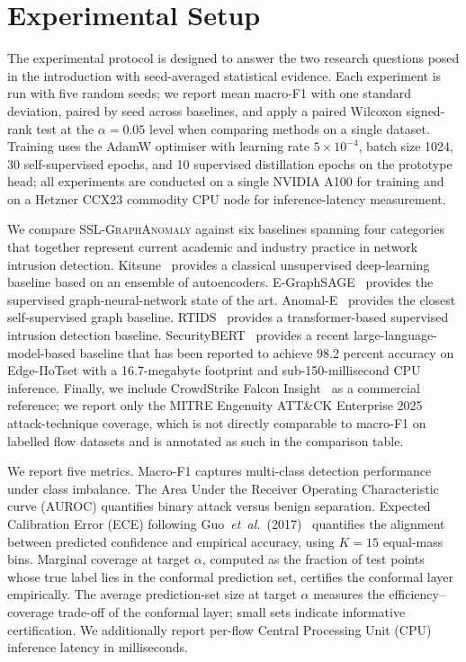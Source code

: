 \documentclass{ieeeaccess}
\begin{document}
\section{Experimental Setup}
\label{sec:experiments}
The experimental protocol is designed to answer the two research questions
posed in the introduction with seed-averaged statistical evidence. Each
experiment is run with five random seeds; we report mean macro-F1 with one
standard deviation, paired by seed across baselines, and apply a paired
Wilcoxon signed-rank test at the $\alpha = 0.05$ level when comparing
methods on a single dataset. Training uses the AdamW optimiser with
learning rate $5 \times 10^{-4}$, batch size 1024, 30 self-supervised
epochs, and 10 supervised distillation epochs on the prototype head; all
experiments are conducted on a single NVIDIA A100 for training and on a
Hetzner CCX23 commodity CPU node for inference-latency measurement.

We compare \textsc{SSL-GraphAnomaly} against six baselines spanning four
categories that together represent current academic and industry practice
in network intrusion detection. Kitsune~\cite{mirsky2018kitsune} provides
a classical unsupervised deep-learning baseline based on an ensemble of
autoencoders. E-GraphSAGE~\cite{lo2022egraphsage} provides the supervised
graph-neural-network state of the art. Anomal-E~\cite{caville2022anomale}
provides the closest self-supervised graph baseline. RTIDS~\cite{wu2022rtids}
provides a transformer-based supervised intrusion detection baseline.
SecurityBERT~\cite{ferrag2024securitybert} provides a recent
large-language-model-based baseline that has been reported to achieve
98.2 percent accuracy on Edge-IIoTset with a 16.7-megabyte footprint and
sub-150-millisecond CPU inference. Finally, we include
CrowdStrike Falcon Insight~\cite{crowdstrike2025mitre} as a commercial
reference; we report only the MITRE Engenuity ATT\&CK Enterprise 2025
attack-technique coverage, which is not directly comparable to macro-F1 on
labelled flow datasets and is annotated as such in the comparison table.

We report five metrics. Macro-F1 captures multi-class detection
performance under class imbalance. The Area Under the Receiver Operating
Characteristic curve (AUROC) quantifies binary attack versus benign
separation. Expected Calibration Error (ECE) following
Guo~\emph{et~al.}~(2017)~\cite{guo2017calibration} quantifies the
alignment between predicted confidence and empirical accuracy, using
$K=15$ equal-mass bins. Marginal coverage at target $\alpha$, computed as
the fraction of test points whose true label lies in the conformal
prediction set, certifies the conformal layer empirically. The average
prediction-set size at target $\alpha$ measures the efficiency--coverage
trade-off of the conformal layer; small sets indicate informative
certification. We additionally report per-flow Central Processing Unit
(CPU) inference latency in milliseconds.
\end{document}
